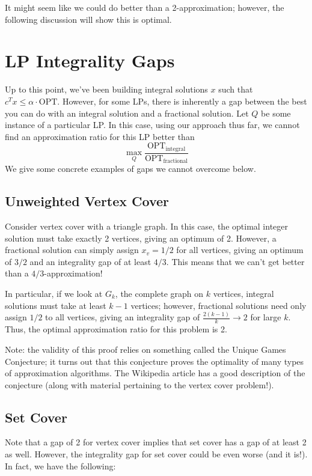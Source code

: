 \documentclass[11pt]{article}
\begin{document}
It might seem like we could do better than a 2-approximation; however, the following discussion will show this is optimal.

\section{LP Integrality Gaps}
Up to this point, we've been building integral solutions $x$ such that $c^Tx \le \alpha \cdot \text{OPT}$.  However, for some LPs, there is inherently a gap between the best you can do with an integral solution and a fractional solution.  Let $Q$ be some instance of a particular LP.  In this case, using our approach thus far, we cannot find an approximation ratio for this LP better than
$$\max_Q \frac{\text{OPT}_{\text{integral}}}{\text{OPT}_{\text{fractional}}}$$
We give some concrete examples of gaps we cannot overcome below.

\subsection{Unweighted Vertex Cover}
Consider vertex cover with a triangle graph.  In this case, the optimal integer solution must take exactly 2 vertices, giving an optimum of 2.  However, a fractional solution can simply assign $x_v = 1/2$ for all vertices, giving an optimum of $3/2$ and an integrality gap of at least $4/3$.  This means that we can't get better than a $4/3$-approximation!

In particular, if we look at $G_k$, the complete graph on $k$ vertices, integral solutions must take at least $k - 1$ vertices; however, fractional solutions need only assign $1/2$ to all vertices, giving an integrality gap of $\frac{2(k-1)}{k} \rightarrow 2$ for large $k$.  Thus, the optimal approximation ratio for this problem is 2.

Note: the validity of this proof relies on something called the Unique Games Conjecture; it turns out that this conjecture proves the optimality of many types of approximation algorithms.  The Wikipedia article has a good description of the conjecture (along with material pertaining to the vertex cover problem!).

\subsection{Set Cover}
Note that a gap of 2 for vertex cover implies that set cover has a gap of at least 2 as well.  However, the integrality gap for set cover could be even worse (and it is!).  In fact, we have the following:
\end{document}
